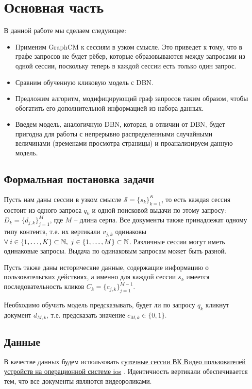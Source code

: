 \documentclass[diploma]{nanolab2015}
\begin{document}
\chapter{Основная часть}
В данной работе мы сделаем следующее:
\begin{itemize}
    \item Применим GraphCM к сессиям в узком смысле. Это приведет к тому, что в графе запросов не будет рёбер, которые образовываются между запросами из одной сессии, поскольку теперь в каждой сессии есть только один запрос.
    \item Сравним обученную кликовую модель с DBN.
    \item Предложим алгоритм, модифицирующий граф запросов таким образом, чтобы обогатить его дополнительной информацией из набора данных.
    \item Введем модель, аналогичную DBN, которая, в отличии от DBN, будет пригодна для работы с непрерывно распределенными случайными величинами (временами просмотра страницы) и проанализируем данную модель.
\end{itemize}
\section{Формальная постановка задачи}
Пусть нам даны сессии в узком смысле $\mathcal{S} = \{s_k\}_{k=1}^K$, то есть каждая сессия состоит из одного запроса $q_k$ и одной поисковой выдачи по этому запросу: $D_k = \{d_{j, k}\}_{j=1}^M$, где $M$ -- длина серпа. Все документы также принадлежат одному типу контента, т.е. их вертикали $v_{j, k}$ одинаковы $\forall \; \space i \in \{1, \dots, K\} \subset \mathbb{N}, \; j \in \{1, \dots, M\} \subset \mathbb{N}$. Различные сессии могут иметь одинаковые запросы. Выдача по одинаковым запросам может быть разной.

Пусть также даны исторические данные, содержащие информацию о пользовательских действиях, а именно для каждой сессии $s_k$ имеется последовательность кликов $C_k = \{c_{j,k}\}_{j=1}^{M-1}$.

Необходимо обучить модель предсказывать, будет ли по запросу $q_k$ кликнут документ $d_{M, k}$, т.е. предсказать значение $c_{M, k} \in \{0, 1\}$.

\section{Данные}
В качестве данных будем использовать \href{https://github.com/agcr/vk-msu-ir-course-spring-2024/blob/055b4329ad60466c238044d3d1d16d2b9c9764d9/seminars/6-behaviour-ranking/iphone-20240201.tsv.gz}{суточные сессии ВК Видео пользователей устройств на операционной системе ios} \cite{vkds}. Идентичность вертикали обеспечивается тем, что все документы являются видеороликами.
\end{document}
